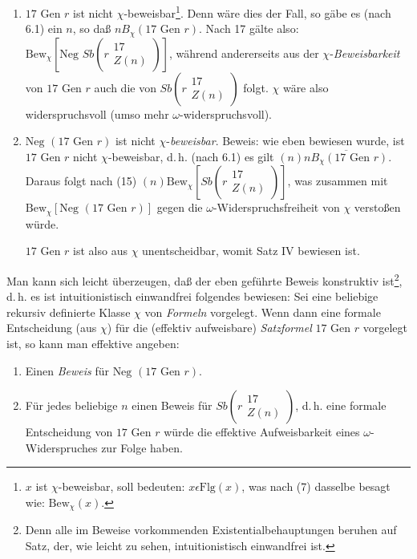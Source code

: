 \documentclass[draft]{scrartcl}
\newcommand{\fnfunfundvierziga}{45a}
\let\oldleft\left
\let\oldright\right
\def\left#1{%
	    \global\advance\bracketnum1\relax 
		\colorlet{temp}{.}%
		    \csname bracketcolor\the\bracketnum\endcsname
			\oldleft#1%
			    \color{temp}%
	}
\def\right#1{%
	    \colorlet{temp}{.}%
		\csname bracketcolor\the\bracketnum\endcsname
		    \oldright#1%
			\global\advance\bracketnum-1\relax
			    \color{temp}%
	}
\def\left#1{#1}
\def\right#1{#1}
\begin{document}
\begin{enumerate}
	\item $17 \text{ Gen } r$ ist nicht $\chi$-beweisbar\footnote{$x$ 
		ist $\chi$-beweisbar, soll bedeuten: $x \epsilon \text{Flg}\left(x\right)$, 
		was nach (7) dasselbe besagt wie: $\text{Bew}_\chi\left(x\right)$.}. Denn 
		wäre dies der Fall, so gäbe es (nach 6.1) ein $n$, so daß 
		$n B_\chi \left(17 \text{ Gen } r\right)$. Nach 17 gälte also: 
		$\text{Bew}_\chi \left[\text{Neg }Sb\left(r\substack{17\\ Z\left(n\right)}\right)\right]$, 
		während andererseits aus der $\chi$-\textit{Beweisbarkeit} von $17 \text{ Gen } r$ auch 
		die von $Sb \left(r\substack{17\\ Z\left(n\right)}\right)$ folgt. $\chi$ wäre also 
		widerspruchsvoll (umso mehr $\omega$-widerspruchsvoll).

	\item $\text{Neg }\left(17 \text{ Gen } r\right)$ ist nicht 
		$\chi$-\textit{beweisbar}. Beweis: wie eben bewiesen wurde, 
		ist $17 \text{ Gen } r$ nicht $\chi$-beweisbar, d.\,h. 
		(nach 6.1) es gilt $\left(n\right)\overline{n B_\chi\left(17\text{ Gen } r\right)}$. 
		Daraus folgt nach (15) $\left(n\right) \text{Bew}_\chi\left[Sb\left(r\substack{17\\ Z\left(n\right)}\right)\right]$,
		was zusammen mit $\text{Bew}_\chi\left[\text{Neg }\left(17 \text{ Gen } r\right)\right]$ 
		gegen die $\omega$-Widerspruchsfreiheit von $\chi$ verstoßen würde.

	$17\text{ Gen } r$ ist also aus $\chi$ unentscheidbar, womit Satz IV bewiesen ist.
\end{enumerate}

\let\originalfootnote=\thefootnote
\let\thefootnote=\fnfunfundvierziga
Man kann sich leicht überzeugen, daß der eben geführte Beweis konstruktiv ist\footnote{Denn alle im Beweise vorkommenden Existentialbehauptungen beruhen auf Satz, der, wie leicht zu sehen, intuitionistisch einwandfrei ist.},
\let\thefootnote=\originalfootnote
\setcounter{footnote}{45}
d.\,h. es ist intuitionistisch einwandfrei folgendes bewiesen:
Sei eine beliebige rekursiv definierte Klasse $\chi$ 
von \textit{Formeln} vorgelegt. Wenn dann eine formale Entscheidung (aus $\chi$) für die (effektiv aufweisbare)
\textit{Satzformel} $17 \text{ Gen } r$ vorgelegt ist, so kann man effektive angeben:

\begin{enumerate}
	\item Einen \textit{Beweis} für $\text{Neg }\left(17 \text{ Gen } r\right)$.
	\item Für jedes beliebige $n$ einen Beweis für $Sb\left(r\substack{17\\ Z\left(n\right)}\right)$, d.\,h. eine formale Entscheidung von $17\text{ Gen } r$ würde die effektive Aufweisbarkeit eines $\omega$-Widerspruches zur Folge haben.
\end{enumerate}
\end{document}
